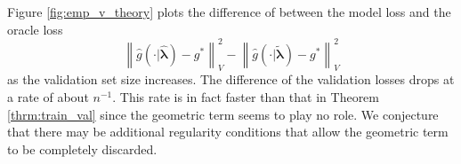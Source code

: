 \documentclass[12pt]{article}
\begin{document}
Figure \ref{fig:emp_v_theory} plots the difference of between the model loss and the oracle loss
$$
\left \| \hat{g}(\cdot | \hat{\boldsymbol{\lambda}}) - g^* \right \|_V^2 - 
\left \| \hat{g}(\cdot | \tilde{\boldsymbol{\lambda}}) - g^* \right \|_V^2
$$
as the validation set size increases. The difference of the validation losses drops at a rate of about $n^{-1}$. This rate is in fact faster than that in Theorem \ref{thrm:train_val} since the geometric term seems to play no role. We conjecture that there may be additional regularity conditions that allow the geometric term to be completely discarded.

\end{document}
